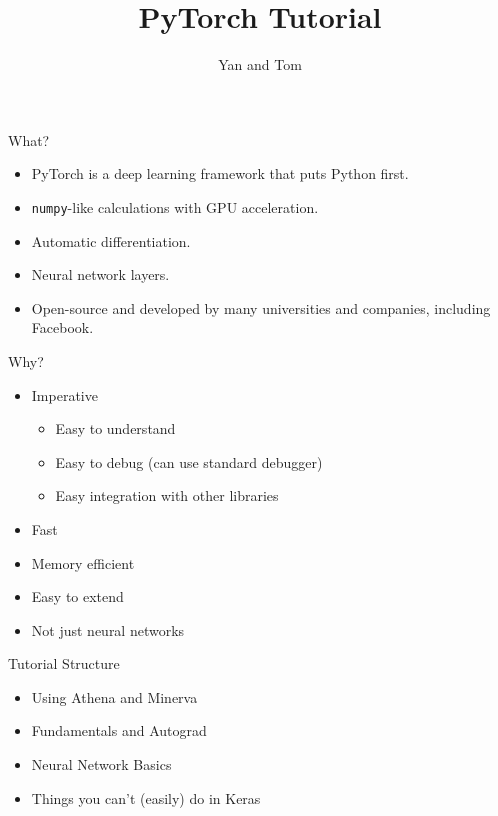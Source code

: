 \documentclass{beamer}
\title{PyTorch Tutorial}
\author{Yan and Tom}
\begin{document}
	\maketitle
	
	\begin{frame}{What?}
	\begin{itemize}
		\item PyTorch is a deep learning framework that puts Python first.
		\item \texttt{numpy}-like calculations with GPU acceleration.
		\item Automatic differentiation.
		\item Neural network layers.
		\item Open-source and developed by many universities and companies, including Facebook.
	\end{itemize}
	\end{frame}

	\begin{frame}{Why?}
	\begin{itemize}
		\item Imperative
			\begin{itemize}
				\item Easy to understand
				\item Easy to debug (can use standard debugger)
				\item Easy integration with other libraries
			\end{itemize}
		\item Fast
		\item Memory efficient
		\item Easy to extend
		\item Not just neural networks
	\end{itemize}
	\end{frame}

	\begin{frame}{Tutorial Structure}
	\begin{itemize}
		\item Using Athena and Minerva
		\item Fundamentals and Autograd
		\item Neural Network Basics
		\item Things you can't (easily) do in Keras 
	\end{itemize}
	\end{frame}
\end{document}

